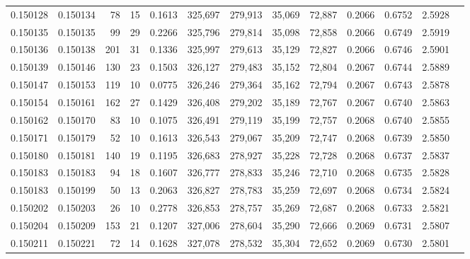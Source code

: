 \begin{tabular}{rrrrrrrrrrrrr}
0.150128 & 0.150134 &    78 &  15 &                                     0.1613 & 325,697 & 279,913 &  35,069 &  72,887 & 0.2066 & 0.6752 & 2.5928 \\
0.150135 & 0.150135 &    99 &  29 &                                     0.2266 & 325,796 & 279,814 &  35,098 &  72,858 & 0.2066 & 0.6749 & 2.5919 \\
0.150136 & 0.150138 &   201 &  31 &                                     0.1336 & 325,997 & 279,613 &  35,129 &  72,827 & 0.2066 & 0.6746 & 2.5901 \\
0.150139 & 0.150146 &   130 &  23 &                                     0.1503 & 326,127 & 279,483 &  35,152 &  72,804 & 0.2067 & 0.6744 & 2.5889 \\
0.150147 & 0.150153 &   119 &  10 &                                     0.0775 & 326,246 & 279,364 &  35,162 &  72,794 & 0.2067 & 0.6743 & 2.5878 \\
0.150154 & 0.150161 &   162 &  27 &                                     0.1429 & 326,408 & 279,202 &  35,189 &  72,767 & 0.2067 & 0.6740 & 2.5863 \\
0.150162 & 0.150170 &    83 &  10 &                                     0.1075 & 326,491 & 279,119 &  35,199 &  72,757 & 0.2068 & 0.6740 & 2.5855 \\
0.150171 & 0.150179 &    52 &  10 &                                     0.1613 & 326,543 & 279,067 &  35,209 &  72,747 & 0.2068 & 0.6739 & 2.5850 \\
0.150180 & 0.150181 &   140 &  19 &                                     0.1195 & 326,683 & 278,927 &  35,228 &  72,728 & 0.2068 & 0.6737 & 2.5837 \\
0.150183 & 0.150183 &    94 &  18 &                                     0.1607 & 326,777 & 278,833 &  35,246 &  72,710 & 0.2068 & 0.6735 & 2.5828 \\
0.150183 & 0.150199 &    50 &  13 &                                     0.2063 & 326,827 & 278,783 &  35,259 &  72,697 & 0.2068 & 0.6734 & 2.5824 \\
0.150202 & 0.150203 &    26 &  10 &                                     0.2778 & 326,853 & 278,757 &  35,269 &  72,687 & 0.2068 & 0.6733 & 2.5821 \\
0.150204 & 0.150209 &   153 &  21 &                                     0.1207 & 327,006 & 278,604 &  35,290 &  72,666 & 0.2069 & 0.6731 & 2.5807 \\
0.150211 & 0.150221 &    72 &  14 &                                     0.1628 & 327,078 & 278,532 &  35,304 &  72,652 & 0.2069 & 0.6730 & 2.5801 \\

\end{tabular}
